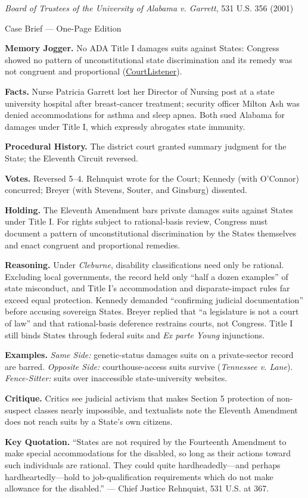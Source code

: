 \documentclass[12pt]{article}
\begin{document}
\begin{center}
{\Large \textit{Board of Trustees of the University of Alabama v. Garrett}, 531 U.S. 356 (2001)\par}
\vspace{0.3em}
{\normalsize Case Brief --- One-Page Edition\par}
\end{center}

\textbf{Memory Jogger.} No ADA Title I damages suits against States: Congress showed no pattern of unconstitutional state discrimination and its remedy was not congruent and proportional (\href{https://www.courtlistener.com/opinion/118407/board-of-trustees-of-univ-of-ala-v-garrett/}{CourtListener}).

\textbf{Facts.} Nurse Patricia Garrett lost her Director of Nursing post at a state university hospital after breast-cancer treatment; security officer Milton Ash was denied accommodations for asthma and sleep apnea. Both sued Alabama for damages under Title I, which expressly abrogates state immunity.

\textbf{Procedural History.} The district court granted summary judgment for the State; the Eleventh Circuit reversed.

\textbf{Votes.} Reversed 5--4. Rehnquist wrote for the Court; Kennedy (with O'Connor) concurred; Breyer (with Stevens, Souter, and Ginsburg) dissented.

\textbf{Holding.} The Eleventh Amendment bars private damages suits against States under Title I. For rights subject to rational-basis review, Congress must document a pattern of unconstitutional discrimination by the States themselves and enact congruent and proportional remedies.

\textbf{Reasoning.} Under \textit{Cleburne}, disability classifications need only be rational. Excluding local governments, the record held only ``half a dozen examples'' of state misconduct, and Title I's accommodation and disparate-impact rules far exceed equal protection. Kennedy demanded ``confirming judicial documentation'' before accusing sovereign States. Breyer replied that ``a legislature is not a court of law'' and that rational-basis deference restrains courts, not Congress. Title I still binds States through federal suits and \textit{Ex parte Young} injunctions.

\textbf{Examples.} \emph{Same Side:} genetic-status damages suits on a private-sector record are barred. \emph{Opposite Side:} courthouse-access suits survive (\textit{Tennessee v. Lane}). \emph{Fence-Sitter:} suits over inaccessible state-university websites.

\textbf{Critique.} Critics see judicial activism that makes Section 5 protection of non-suspect classes nearly impossible, and textualists note the Eleventh Amendment does not reach suits by a State's own citizens.

\textbf{Key Quotation.} ``States are not required by the Fourteenth Amendment to make special accommodations for the disabled, so long as their actions toward such individuals are rational. They could quite hardheadedly---and perhaps hardheartedly---hold to job-qualification requirements which do not make allowance for the disabled.'' --- Chief Justice Rehnquist, 531 U.S. at 367.
\end{document}
